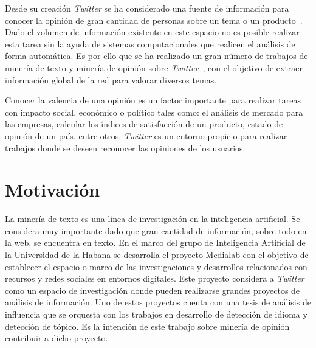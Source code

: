 \begin{introduction}

Desde su creación \emph{Twitter} se ha considerado una fuente de información para conocer la opinión de
gran cantidad de personas sobre un tema o un producto~\cite{Bollen}. Dado el volumen de información 
existente en este espacio no es posible
realizar esta tarea sin la ayuda de sistemas computacionales que realicen el análisis de forma automática.
Es por ello que se ha realizado un gran número de trabajos de minería de texto y minería de opinión
sobre \emph{Twitter}~\cite{Bollen, Pang}, con el objetivo de extraer información global 
de la red para valorar diversos temas.

Conocer la valencia de una opinión es un factor importante para realizar tareas
con impacto social, económico o político tales como: el análisis de
mercado para las empresas, calcular los índices de sa\-tis\-fac\-ción de un producto,
estado de opinión de un país, entre otros. \emph{Twitter} es un entorno 
propicio para realizar trabajos donde se deseen reconocer las opiniones de los usuarios. 

\section*{Motivación}

La minería de texto es una línea de investigación en la inteligencia 
artificial. Se considera muy importante dado que gran cantidad de
información, sobre todo en la web, se encuentra en texto.
En el marco del grupo de Inteligencia Artificial de la 
Universidad de la Habana se desarrolla el proyecto Medialab con
el objetivo de establecer el espacio o marco de las investigaciones y desarrollos
relacionados con recursos y redes sociales en entornos digitales.
Este proyecto considera a \emph{Twitter} como un 
espacio de investigación donde pueden realizarse grandes proyectos 
de análisis de información. Uno de estos proyectos cuenta con una 
tesis de análisis de influencia que se orquesta con los trabajos en 
desarrollo de detección de idioma y detección de tópico. 
Es la intención de este trabajo sobre minería de opinión contribuir a dicho
proyecto.



\end{introduction}
